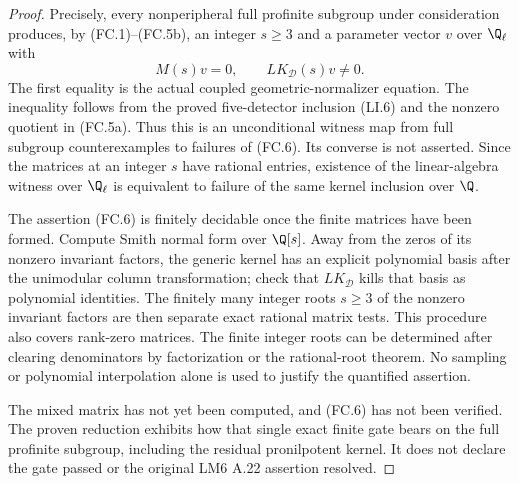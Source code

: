 \begin{proof}
Precisely, every nonperipheral full
profinite subgroup under consideration
produces, by (FC.1)--(FC.5b), an integer
$s\geq3$ and a parameter vector $v$ over
$\Q_\ell$ with
\[
               M(s)v=0,\qquad LK_{\mathcal D}(s)v\ne0.
                                                               \tag{FC.7}
\]
The first equality is the actual coupled
geometric-normalizer equation. The
inequality follows from the proved
five-detector inclusion (LI.6) and the
nonzero quotient in (FC.5a). Thus this
is an unconditional witness map from
full subgroup counterexamples to failures
of (FC.6). Its converse is not asserted.
Since the matrices at an integer $s$
have rational entries, existence of the
linear-algebra witness over $\Q_\ell$
is equivalent to failure of the same
kernel inclusion over $\Q$.

The assertion (FC.6) is finitely decidable
once the finite matrices have been formed.
Compute Smith normal form over $\Q[s]$.
Away from the zeros of its nonzero invariant
factors, the generic kernel has an explicit
polynomial basis after the unimodular
column transformation; check that
$LK_{\mathcal D}$ kills that basis as
polynomial identities. The finitely many
integer roots $s\geq3$ of the nonzero
invariant factors are then separate exact
rational matrix tests. This procedure also
covers rank-zero matrices. The finite
integer roots can be determined after
clearing denominators by factorization or
the rational-root theorem. No sampling
or polynomial interpolation alone is
used to justify the quantified assertion.

The mixed matrix has not yet been
computed, and (FC.6) has not been verified.
The proven reduction exhibits how that
single exact finite gate bears on the
full profinite subgroup, including the
residual pronilpotent kernel. It does not
declare the gate passed or the original
LM6 A.22 assertion resolved.

\end{proof}
